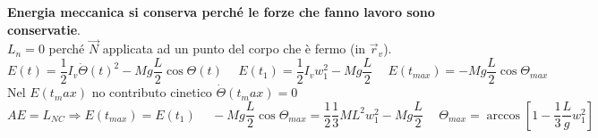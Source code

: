 \hspace{-15pt}\textbf{Energia meccanica si conserva perché le forze che fanno lavoro sono conservatie}.\\
$L_n = 0$ perché $\vec{N}$ applicata ad un punto del corpo che è fermo (in $\vec{r}_v$).
$$E(t) = \frac{1}{2}I_v\dot{\Theta}(t)^2 - Mg\frac{L}{2}\cos\Theta(t) \hspace{15pt} E(t_1) = \frac{1}{2}I_v w_1^2 - Mg \frac{L}{2} \hspace{15pt} E(t_{max}) = -Mg\frac{L}{2}\cos\Theta_{max}$$
Nel $E(t_max)$ no contributo cinetico $\dot{\Theta}(t_max) = 0$
$$AE = L_{NC} \Rightarrow E(t_{max}) = E(t_1) \hspace{15pt}-Mg\frac{L}{2}\cos\Theta_{max} = \frac{1}{2}\frac{1}{3}ML^2 w_1^2 - Mg\frac{L}{2} \hspace{15pt} \Theta_{max} = \arccos[1 - \frac{1}{3}\frac{L}{g}w_1^2]$$